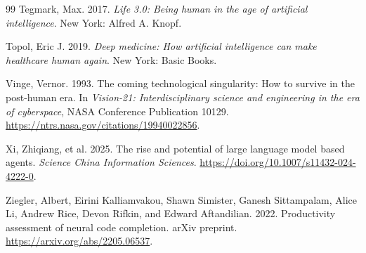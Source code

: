 \documentclass[11pt]{article}
\begin{document}
\begin{thebibliography}{99}
Tegmark, Max. 2017. \textit{Life 3.0: Being human in the age of artificial intelligence}. New York: Alfred A. Knopf.

Topol, Eric J. 2019. \textit{Deep medicine: How artificial intelligence can make healthcare human again}. New York: Basic Books.

Vinge, Vernor. 1993. The coming technological singularity: How to survive in the post-human era. In \textit{Vision-21: Interdisciplinary science and engineering in the era of cyberspace}, NASA Conference Publication 10129. \url{https://ntrs.nasa.gov/citations/19940022856}.


Xi, Zhiqiang, et al. 2025. The rise and potential of large language model based agents. \textit{Science China Information Sciences}. \url{https://doi.org/10.1007/s11432-024-4222-0}.

Ziegler, Albert, Eirini Kalliamvakou, Shawn Simister, Ganesh Sittampalam, Alice Li, Andrew Rice, Devon Rifkin, and Edward Aftandilian. 2022. Productivity assessment of neural code completion. arXiv preprint. \url{https://arxiv.org/abs/2205.06537}.

\end{thebibliography}
\end{document}
